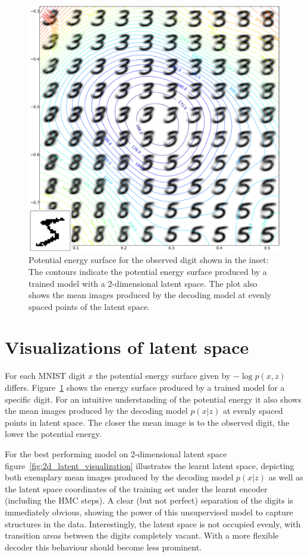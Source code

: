 \begin{appendices}
\begin{figure}[hb]
\centering
\includegraphics[width=\columnwidth]{figures/vae_pot_energy_example.pdf}
\caption{Potential energy surface for the observed digit shown in the inset: The contours indicate the potential energy surface produced by a trained model with a 2-dimensional latent space. The plot also shows the mean images produced by the decoding model at evenly spaced points of the latent space.}
\label{fig:EnergySurfaceMNIST}
\end{figure}

\section{Visualizations of latent space}
\label{app:LatentVisualizations}

For each MNIST digit $x$ the potential energy surface given by $-\log p(x, z)$ differs. Figure~\ref{fig:EnergySurfaceMNIST} shows the energy surface produced by a trained model for a specific digit. For an intuitive understanding of the potential energy it also shows the mean images produced by the decoding model $p(x|z)$ at evenly spaced points in latent space. The closer the mean image is to the observed digit, the lower the potential energy.

For the best performing model on 2-dimensional latent space figure~\ref{fig:2d_latent_visualization} illustrates the learnt latent space, depicting both exemplary mean images produced by the decoding model $p(x|z)$ as well as the latent space coordinates of the training set under the learnt encoder (including the HMC steps). A clear (but not perfect) separation of the digits is immediately obvious, showing the power of this unsupervised model to capture structures in the data. Interestingly, the latent space is not occupied evenly, with transition areas between the digits completely vacant. With a more flexible decoder this behaviour should become less prominent.


\end{appendices}

